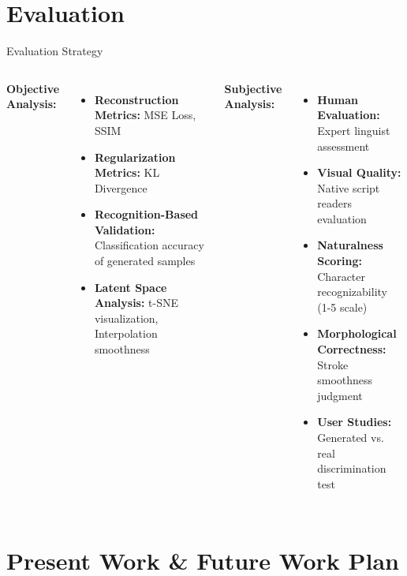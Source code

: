\documentclass[aspectratio=169, 12pt]{beamer}
\begin{document}
\section{Evaluation}

\begin{frame}{Evaluation Strategy}
    \begin{columns}
        \textbf{Objective Analysis:}
        \begin{itemize}
            \item \textbf{Reconstruction Metrics:} MSE Loss, SSIM
            \item \textbf{Regularization Metrics:} KL Divergence
            \item \textbf{Recognition-Based Validation:} Classification accuracy of generated samples
            \item \textbf{Latent Space Analysis:} t-SNE visualization, Interpolation smoothness
        \end{itemize}
        
        \textbf{Subjective Analysis:}
        \begin{itemize}
            \item \textbf{Human Evaluation:} Expert linguist assessment
            \item \textbf{Visual Quality:} Native script readers evaluation
            \item \textbf{Naturalness Scoring:} Character recognizability (1-5 scale)
            \item \textbf{Morphological Correctness:} Stroke smoothness judgment
            \item \textbf{User Studies:} Generated vs. real discrimination test
        \end{itemize}
    \end{columns}
\end{frame}

\section{Present Work \& Future Work Plan}
\end{document}
